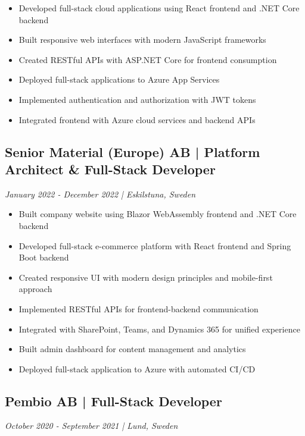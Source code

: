 \documentclass[11pt,a4paper]{article}
\begin{document}
\begin{itemize}[leftmargin=*, itemsep=2pt]
\item Developed full-stack cloud applications using React frontend and .NET Core backend
\item Built responsive web interfaces with modern JavaScript frameworks
\item Created RESTful APIs with ASP.NET Core for frontend consumption
\item Deployed full-stack applications to Azure App Services
\item Implemented authentication and authorization with JWT tokens
\item Integrated frontend with Azure cloud services and backend APIs
\end{itemize}

\subsection*{Senior Material (Europe) AB | Platform Architect \& Full-Stack Developer}
\textit{January 2022 - December 2022 | Eskilstuna, Sweden}

\begin{itemize}[leftmargin=*, itemsep=2pt]
\item Built company website using Blazor WebAssembly frontend and .NET Core backend
\item Developed full-stack e-commerce platform with React frontend and Spring Boot backend
\item Created responsive UI with modern design principles and mobile-first approach
\item Implemented RESTful APIs for frontend-backend communication
\item Integrated with SharePoint, Teams, and Dynamics 365 for unified experience
\item Built admin dashboard for content management and analytics
\item Deployed full-stack application to Azure with automated CI/CD
\end{itemize}

\subsection*{Pembio AB | Full-Stack Developer}
\textit{October 2020 - September 2021 | Lund, Sweden}
\end{document}

